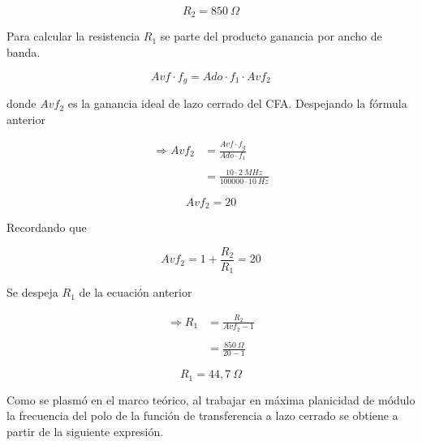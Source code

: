 \begin{equation}
    \boxed{
        R_2 = 850~\Omega
    }
\end{equation}

\bigskip
\hspace{1mm} Para calcular la resistencia $ R_1 $ se parte del producto ganancia por ancho de banda.

\begin{equation}
    Avf \cdot f_g = Ado \cdot f_1 \cdot Avf_2
\end{equation}

\bigskip
\hspace{1mm} donde $ Avf_2 $ es la ganancia ideal de lazo cerrado del CFA. Despejando la fórmula anterior

\begin{align}
   \Longrightarrow Avf_2 &= \frac{Avf \cdot f_g}{Ado \cdot f_1} \label{eq:primera} \\
   \nonumber
   \\
         &= \frac{10 \cdot 2~MHz}{100000 \cdot 10~Hz}
\end{align}

\begin{equation}
    \boxed{
    Avf_2 = 20
    }
\end{equation}

\bigskip
\hspace{1mm} Recordando que 

\begin{equation}
    Avf_2 = 1 + \frac{R_2}{R_1} = 20
\end{equation}

\bigskip
\hspace{1mm} Se despeja $ R_1 $ de la ecuación anterior

\begin{align}
   \Longrightarrow R_1 &= \frac{R_2}{Avf_2 - 1} \label{eq:primera} \\
   \nonumber
   \\ 
                       &= \frac{850~\Omega}{20 - 1}
\end{align}

\begin{equation}
    \boxed{
    R_1 = 44,7~\Omega
    }
\end{equation}

\bigskip
\hspace{1mm} Como se plasmó en el marco teórico, al trabajar en máxima planicidad de módulo la frecuencia del polo de la función de transferencia a lazo cerrado se obtiene a partir de la siguiente expresión.

